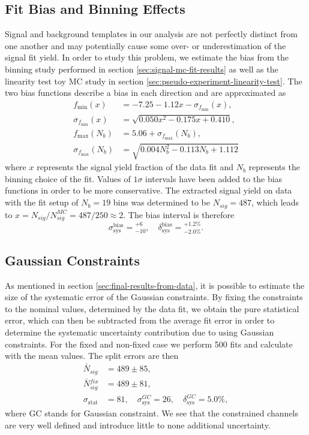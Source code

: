 \subsection{Fit Bias and Binning Effects}
Signal and background templates in our analysis are not perfectly distinct from one another and may potentially cause some over- or underestimation of the signal fit yield. In order to study this problem, we estimate the bias from the binning study performed in section \ref{sec:signal-mc-fit-results} as well as the linearity test toy MC study in section \ref{sec:pseudo-experiment-linearity-test}. The two bias functions describe a bias in each direction and are approximated as
\begin{align}
f_{\mathrm{min}}(x) &= -7.25-1.12x - \sigma_{f_{\mathrm{min}}}(x), \\
\sigma_{f_{\mathrm{min}}}(x) &= \sqrt{0.050 x^2 - 0.175 x + 0.410}, \\
f_{\mathrm{max}}(N_b) &= 5.06 + \sigma_{f_{\mathrm{max}}}(N_b), \\
\sigma_{f_{\mathrm{max}}}(N_b) &= \sqrt{0.004N_b^2 - 0.113 N_b + 1.112}
\end{align}
where $x$ represents the signal yield fraction of the data fit and $N_b$ represents the binning choice of the fit. Values of $1\sigma$ intervals have been added to the bias functions in order to be more conservative. The extracted signal yield on data  with the fit setup of $N_b=19$ bins was determined to be $N_{sig} = 487$, which leads to $x = N_{sig} / N_{sig}^{MC} = 487 / 250 \approx 2$. The bias interval is therefore
\begin{equation}
\sigma_{\mathrm{sys}}^{\mathrm{bias}} = {}^{+6}_{-10},\quad \delta_{\mathrm{sys}}^{\mathrm{bias}} = {}^{+1.2\%}_{-2.0\%}.
\end{equation}

\subsection{Gaussian Constraints}
As mentioned in section \ref{sec:final-results-from-data}, it is possible to estimate the size of the systematic error of the Gaussian constraints. By fixing the constraints to the nominal values, determined by the data fit, we obtain the pure statistical error, which can then be subtracted from the average fit error in order to determine the systematic uncertainty contribution due to using Gaussian constraints. For the fixed and non-fixed case we perform 500 fits and calculate with the mean values. The split errors are then
\begin{align}
\bar N {}_{sig} &= 489 \pm 85, \\
\bar N {}_{sig}^{fix} &= 489 \pm 81, \\
\sigma_{\mathrm{stat}} &= 81,\quad \sigma_{\mathrm{sys}}^{GC} = 26,\quad \delta_{\mathrm{sys}}^{GC} = 5.0\%,
\end{align}
where GC stands for Gaussian constraint. We see that the constrained channels are very well defined and introduce little to none additional uncertainty.


